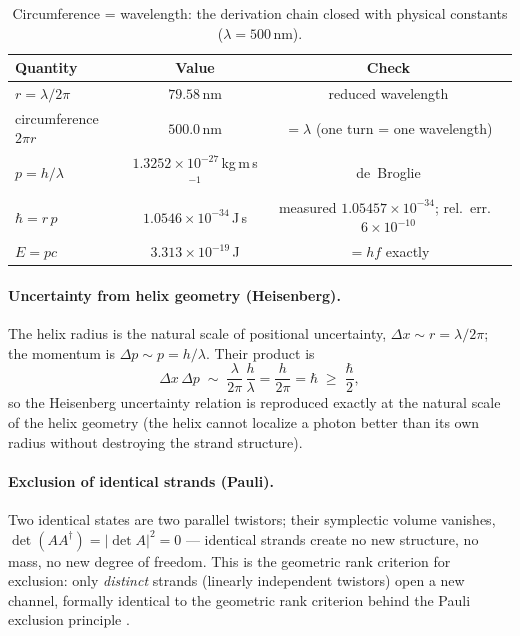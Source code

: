 \documentclass[aps,prd,preprint,superscriptaddress,amsmath,amssymb]{revtex4-2}
\begin{document}
\begin{table}[htbp]
\caption{Circumference = wavelength: the derivation chain closed with
physical constants ($\lambda=500$\,nm).}
\label{tab:circ}
\begin{ruledtabular}
\begin{tabular}{lcc}
Quantity & Value & Check \\
\hline
$r=\lambda/2\pi$ & $79.58$\,nm & reduced wavelength \\
circumference $2\pi r$ & $500.0$\,nm & $=\lambda$ (one turn = one wavelength) \\
$p=h/\lambda$ & $1.3252\times10^{-27}$\,kg\,m\,s$^{-1}$ & de~Broglie \\
$\hbar=r\,p$ & $1.0546\times10^{-34}$\,J\,s & measured $1.05457\times10^{-34}$; rel.\ err.\ $6\times10^{-10}$ \\
$E=pc$ & $3.313\times10^{-19}$\,J & $=hf$ exactly \\
\end{tabular}
\end{ruledtabular}
\end{table}

\paragraph{Uncertainty from helix geometry (Heisenberg).}  The helix
radius is the natural scale of positional uncertainty,
$\Delta x \sim r = \lambda/2\pi$; the momentum is
$\Delta p \sim p = h/\lambda$.  Their product is
\begin{equation}
\Delta x\,\Delta p \;\sim\; \frac{\lambda}{2\pi}\,\frac{h}{\lambda}
= \frac{h}{2\pi} = \hbar \;\ge\; \frac{\hbar}{2},
\end{equation}
so the Heisenberg uncertainty relation
\cite{heisenberg1927anschaulichen} is reproduced exactly at the natural scale of the
helix geometry (the helix cannot localize a photon better than its own radius
without destroying the strand structure).

\paragraph{Exclusion of identical strands (Pauli).}  Two identical
states are two parallel twistors; their symplectic volume vanishes,
$\det(AA^\dagger)=|\det A|^2=0$ --- identical strands create no new
structure, no mass, no new degree of freedom.  This is the geometric rank
criterion for exclusion: only \emph{distinct} strands (linearly
independent twistors) open a new channel, formally identical to the
geometric rank criterion behind the Pauli exclusion principle
\cite{pauli1925zusammenhang}.
\end{document}
